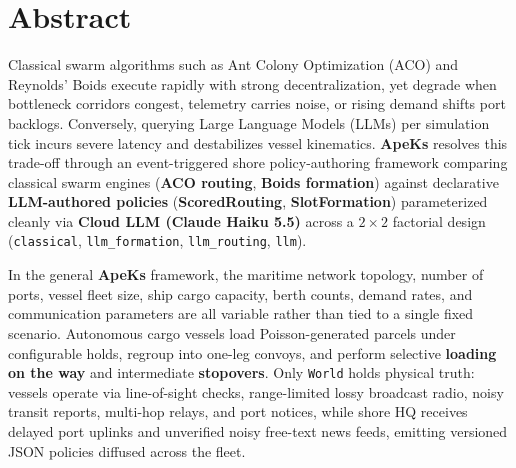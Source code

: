 \documentclass[11pt,a4paper,oneside]{report}
\begin{document}

\chapter*{Abstract}

































Classical swarm algorithms such as Ant Colony Optimization (ACO) and Reynolds' Boids execute rapidly with strong decentralization, yet degrade when bottleneck corridors congest, telemetry carries noise, or rising demand shifts port backlogs. Conversely, querying Large Language Models (LLMs) per simulation tick incurs severe latency and destabilizes vessel kinematics. \textbf{ApeKs} resolves this trade-off through an event-triggered shore policy-authoring framework comparing classical swarm engines (\textbf{ACO routing}, \textbf{Boids formation}) against declarative \textbf{LLM-authored policies} (\textbf{ScoredRouting}, \textbf{SlotFormation}) parameterized cleanly via \textbf{Cloud LLM (Claude Haiku 5.5)} across a $2 \times 2$ factorial design (\texttt{classical}, \texttt{llm\_formation}, \texttt{llm\_routing}, \texttt{llm}).

In the general \textbf{ApeKs} framework, the maritime network topology, number of ports, vessel fleet size, ship cargo capacity, berth counts, demand rates, and communication parameters are all variable rather than tied to a single fixed scenario. Autonomous cargo vessels load Poisson-generated parcels under configurable holds, regroup into one-leg convoys, and perform selective \textbf{loading on the way} and intermediate \textbf{stopovers}. Only \texttt{World} holds physical truth: vessels operate via line-of-sight checks, range-limited lossy broadcast radio, noisy transit reports, multi-hop relays, and port notices, while shore HQ receives delayed port uplinks and unverified noisy free-text news feeds, emitting versioned JSON policies diffused across the fleet.
\end{document}

